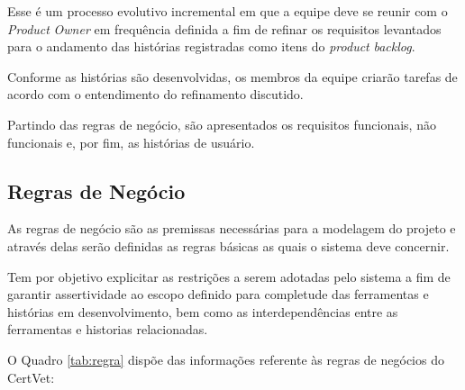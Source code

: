 \documentclass[
    12pt,               %
    openright,          %
    oneside,
    a4paper,            %
    BIBLATEX,           %
    TODO,               %
    english,            %
    brazil              %
    ]{ifsp-spo-inf-ctds}
\begin{document}
        Esse é um processo evolutivo incremental em que a equipe deve se reunir com o \emph{Product} \emph{Owner} em frequência definida a fim de refinar os requisitos levantados para o andamento das histórias registradas como itens do \emph{product} \emph{backlog}. 
        
        Conforme as histórias são desenvolvidas, os membros da equipe criarão tarefas de acordo com o entendimento do refinamento discutido.
        
        Partindo das regras de negócio, são apresentados os requisitos funcionais, não funcionais e, por fim, as histórias de usuário.

         \subsection{Regras de Negócio}
        
            As regras de negócio são as premissas necessárias para a modelagem do projeto e através delas serão definidas as regras básicas as quais o sistema deve concernir.
            
            Tem por objetivo explicitar as restrições a serem adotadas pelo sistema a fim de garantir assertividade ao escopo definido para completude das ferramentas e histórias em desenvolvimento, bem como as interdependências entre as ferramentas e historias relacionadas.
            
            O Quadro \ref{tab:regra} dispõe das informações referente às regras de negócios do CertVet:
\end{document}
